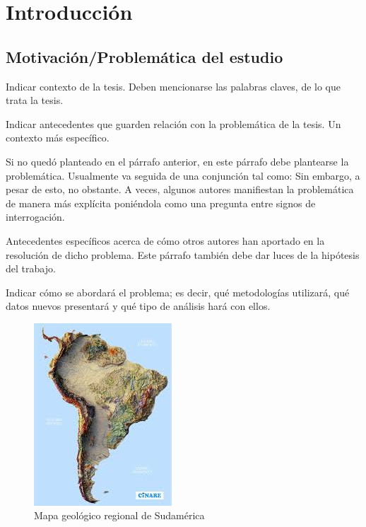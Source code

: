 \setcounter{figure}{0} %
\renewcommand{\thefigure}{\thesection.\arabic{figure}}
\section{\Large Introducción}

\subsection{\large Motivación/Problemática del estudio}

       Indicar contexto de la tesis. Deben mencionarse las palabras claves, de lo que trata la tesis.\par
  
       Indicar antecedentes que guarden relación con la problemática de la tesis. Un contexto más específico.\par
       

       Si no quedó planteado en el párrafo anterior, en este párrafo debe plantearse la problemática. Usualmente va seguida de una conjunción tal como: Sin embargo, a pesar de esto, no obstante. A veces, algunos autores manifiestan la problemática de manera más explícita poniéndola como una pregunta entre signos de interrogación.\par
 
       Antecedentes específicos acerca de cómo otros autores han aportado en la resolución de dicho problema. Este párrafo también debe dar luces de la hipótesis del trabajo.\par

       Indicar cómo se abordará el problema; es decir, qué metodologías utilizará, qué datos nuevos presentará y qué tipo de análisis hará con ellos.

           
    \begin{figure}[h]
        \centering
        \includegraphics[width=0.3\linewidth]{images1.jpg}
        \caption{Mapa geológico regional de Sudamérica}
        \label{fig:mapareg}
    \end{figure}
            
